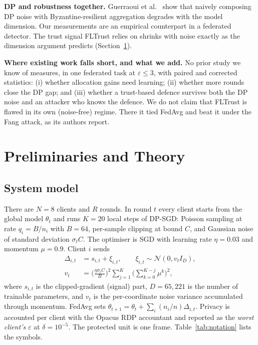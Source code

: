 \documentclass[journal]{IEEEtran}
\newcommand{\eps}{\varepsilon}
\begin{document}
\textbf{DP and robustness together.} Guerraoui et al.~\cite{guerraoui2021dpbyz} show that naively
composing DP noise with Byzantine-resilient aggregation degrades with the model dimension. Our
measurements are an empirical counterpart in a federated detector. The trust signal FLTrust relies
on shrinks with noise exactly as the dimension argument predicts (Section~\ref{sec:theory}).

\textbf{Where existing work falls short, and what we add.} No prior study we know of measures,
in one federated task at $\eps \le 3$, with paired and corrected statistics: (i) whether allocation
gains need learning; (ii) whether more rounds close the DP gap; and (iii) whether a trust-based
defence survives both the DP noise and an attacker who knows the defence. We do not claim that
FLTrust is flawed in its own (noise-free) regime. There it tied FedAvg and beat it under the Fang
attack, as its authors report.

\section{Preliminaries and Theory}
\label{sec:theory}

\subsection{System model}
There are $N=8$ clients and $R$ rounds. In round $t$ every client starts from the global model
$\theta_t$ and runs $K=20$ local steps of DP-SGD: Poisson sampling at rate $q_i = B/n_i$ with
$B = 64$, per-sample clipping at bound $C$, and Gaussian noise of standard deviation $\sigma_t C$.
The optimiser is SGD with learning rate $\eta = 0.03$ and momentum $\mu = 0.9$. Client $i$ sends
\begin{align}
\Delta_{i,t} &= s_{i,t} + \xi_{i,t}, \qquad \xi_{i,t} \sim \mathcal{N}(0, v_t I_D), \label{eq:update}\\
v_t &= \Big(\tfrac{\eta\sigma_t C}{B}\Big)^2 \sum_{j=1}^{K}\Big(\sum_{k=0}^{K-j}\mu^k\Big)^2 , \nonumber
\end{align}
where $s_{i,t}$ is the clipped-gradient (signal) part, $D = 65{,}221$ is the number of trainable
parameters, and $v_t$ is the per-coordinate noise variance accumulated through momentum. FedAvg sets
$\theta_{t+1} = \theta_t + \sum_i (n_i/n)\Delta_{i,t}$. Privacy is accounted per client with the
Opacus RDP accountant and reported as the \emph{worst client's} $\eps$ at $\delta = 10^{-5}$. The
protected unit is one frame. Table~\ref{tab:notation} lists the symbols.
\end{document}
